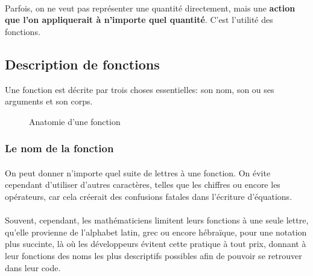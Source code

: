 \documentclass[a4paper]{book}
\begin{document}
    \paragraph{}
    Parfois, on ne veut pas représenter une quantité directement, mais une \textbf{action que l'on appliquerait à n'importe quel quantité}. C'est l'utilité des fonctions.
    
    \subsection{Description de fonctions}
    Une fonction est décrite par trois choses essentielles: son nom, son ou ses arguments et son corps.
    \begin{figure}[h]
        \centering
        \caption{Anatomie d'une fonction}
        \label{fig:function_anatomy}
    \end{figure}
    \subsubsection{Le nom de la fonction}
    \paragraph{}
    On peut donner n'importe quel suite de lettres à une fonction. On évite cependant d'utiliser d'autres caractères, telles que les chiffres ou encore les opérateurs, car cela créerait des confusions fatales dans l'écriture d'équations.
    \paragraph{}
    Souvent, cependant, les mathématiciens limitent leurs fonctions à une seule lettre, qu'elle provienne de l'alphabet latin, grec ou encore hébraïque, pour une notation plus succinte, là où les développeurs évitent cette pratique à tout prix, donnant à leur fonctions des noms les plus descriptifs possibles afin de pouvoir se retrouver dans leur code.
    
\end{document}
